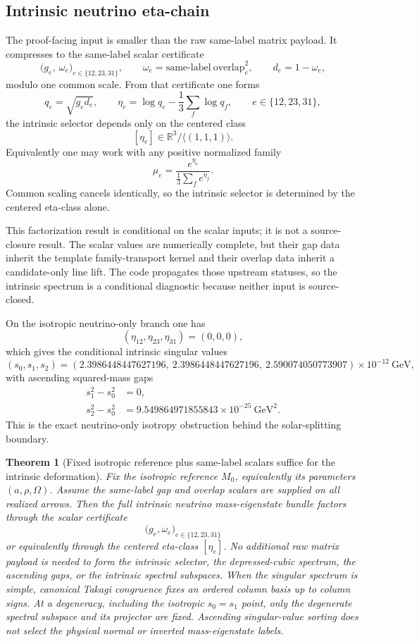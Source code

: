 \documentclass[11pt]{article}
\newtheorem{theorem}{Theorem}[section]
\begin{document}
\subsection{Intrinsic neutrino eta-chain}

The proof-facing input is smaller than the raw same-label matrix payload. It compresses to the
same-label scalar certificate
\[
\bigl(g_e,\ \omega_e\bigr)_{e\in\{12,23,31\}},
\qquad
\omega_e=\mathrm{same\text{-}label\ overlap}_e^2,
\qquad
d_e=1-\omega_e,
\]
modulo one common scale. From that certificate one forms
\[
q_e=\sqrt{g_e d_e},
\qquad
\eta_e=\log q_e-\frac13\sum_f \log q_f,
\qquad
e\in\{12,23,31\},
\]
the intrinsic selector depends only on the centered class
\[
[\eta_e]\in \mathbb{R}^3/\langle(1,1,1)\rangle.
\]
Equivalently one may work with any positive normalized family
\[
\mu_e=\frac{e^{\eta_e}}{\frac13\sum_f e^{\eta_f}}.
\]
Common scaling cancels identically, so the intrinsic selector is determined by the centered
eta-class alone.

This factorization result is conditional on the scalar inputs; it is not a source-closure result.
The scalar values are numerically complete, but their gap data inherit the template
family-transport kernel and their overlap data inherit a candidate-only line lift. The code
propagates those upstream statuses, so the intrinsic spectrum is a conditional diagnostic
because neither input is source-closed.

On the isotropic neutrino-only branch one has
\[
(\eta_{12},\eta_{23},\eta_{31})=(0,0,0),
\]
which gives the conditional intrinsic singular values
\[
(s_0,s_1,s_2)=
(2.3986448447627196,\ 2.3986448447627196,\ 2.590074050773907)\times10^{-12}\ \mathrm{GeV},
\]
with ascending squared-mass gaps
\[
\begin{aligned}
s_1^2-s_0^2&=0,\\
s_2^2-s_0^2&=9.549864971855843\times10^{-25}\ \mathrm{GeV}^2.
\end{aligned}
\]
This is the exact neutrino-only isotropy obstruction behind the solar-splitting boundary.

\begin{theorem}[Fixed isotropic reference plus same-label scalars suffice for the intrinsic deformation]
Fix the isotropic reference \(M_0\), equivalently its parameters
\((a,\rho,\Omega)\). Assume the same-label gap and overlap scalars are supplied on all realized
arrows. Then the full
intrinsic neutrino mass-eigenstate bundle factors through the scalar certificate
\[
\bigl(g_e,\omega_e\bigr)_{e\in\{12,23,31\}}
\]
or equivalently through the centered eta-class \([\eta_e]\). No additional raw matrix payload is
needed to form the intrinsic selector, the depressed-cubic spectrum, the ascending gaps, or
the intrinsic spectral subspaces. When the singular spectrum is simple, canonical Takagi
congruence fixes an ordered column basis up to column signs. At a degeneracy, including the
isotropic \(s_0=s_1\) point, only the degenerate spectral subspace and its projector are fixed.
Ascending singular-value sorting does not select the physical normal or inverted mass-eigenstate
labels.
\end{theorem}
\end{document}
